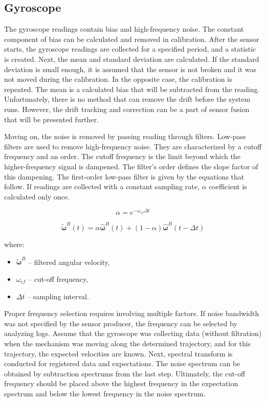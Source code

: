 \subsection{Gyroscope}

The gyroscope readings contain bias and high-frequency noise. The constant component of bias can be calculated and removed in calibration. After the sensor starts, the gyroscope readings are collected for a specified period, and a statistic is created. Next, the mean and standard deviation are calculated. If the standard deviation is small enough, it is assumed that the sensor is not broken and it was not moved during the calibration. In the opposite case, the calibration is repeated. The mean is a calculated bias that will be subtracted from the reading. Unfortunately, there is no method that can remove the drift before the system runs. However, the drift tracking and correction can be a part of sensor fusion that will be presented further.


Moving on, the noise is removed by passing reading through filters. Low-pass filters are used to remove high-frequency noise. They are characterized by a cutoff frequency and an order. The cutoff frequency is the limit beyond which the higher-frequency signal is dampened. The filter’s order defines the slope factor of this dampening. The first-order low-pass filter is given by the equations that follow. If readings are collected with a constant sampling rate, $\alpha$ coefficient is calculated only once.

\begin{equation}
	 \alpha = e^{ - \omega_{cf} \varDelta t}
	\label{lpf_alpha}
\end{equation}

\begin{equation}
	\bm{\tilde{\omega}}^B(t) = \alpha  \bm{\hat{\omega}}^B(t) + \left( 1 - \alpha \right) \bm{\hat{\omega}}^B(t - \varDelta t)
	\label{lpf}
\end{equation}

where:
\begin{itemize}
	\item $\bm{\tilde{\omega}}^B$ -- filtered angular velocity,
	\item $\omega_{cf}$ -- cut-off frequency,
	\item $\varDelta t$ -- sampling interval.
\end{itemize}

Proper frequency selection requires involving multiple factors. If noise bandwidth was not specified by the sensor producer, the frequency can be selected by analyzing logs. Assume that the gyroscope was collecting data (without filtration) when the mechanism was moving along the determined trajectory, and for this trajectory, the expected velocities are known. Next, spectral transform is conducted for registered data and expectations. The noise spectrum can be obtained by subtraction spectrums from the last step. Ultimately, the cut-off frequency should be placed above the highest frequency in the expectation spectrum and below the lowest frequency in the noise spectrum.\\

